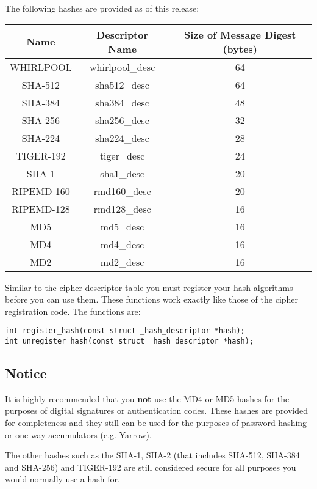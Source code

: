 \documentclass[b5paper]{book}
\begin{document}
The following hashes are provided as of this release:
\begin{center}
\begin{tabular}{|c|c|c|}
      \hline Name & Descriptor Name & Size of Message Digest (bytes) \\
      \hline WHIRLPOOL & whirlpool\_desc & 64 \\
      \hline SHA-512 & sha512\_desc & 64 \\
      \hline SHA-384 & sha384\_desc & 48 \\
      \hline SHA-256 & sha256\_desc & 32 \\
      \hline SHA-224 & sha224\_desc & 28 \\
      \hline TIGER-192 & tiger\_desc & 24 \\
      \hline SHA-1 & sha1\_desc & 20 \\
      \hline RIPEMD-160 & rmd160\_desc & 20 \\
      \hline RIPEMD-128 & rmd128\_desc & 16 \\
      \hline MD5 & md5\_desc & 16 \\
      \hline MD4 & md4\_desc & 16 \\
      \hline MD2 & md2\_desc & 16 \\
      \hline
\end{tabular}
\end{center}

Similar to the cipher descriptor table you must register your hash algorithms before you can use them.  These functions
work exactly like those of the cipher registration code.  The functions are:
\begin{verbatim}
int register_hash(const struct _hash_descriptor *hash);
int unregister_hash(const struct _hash_descriptor *hash);
\end{verbatim}

\subsection{Notice}
It is highly recommended that you \textbf{not} use the MD4 or MD5 hashes for the purposes of digital signatures or authentication codes.  
These hashes are provided for completeness and they still can be used for the purposes of password hashing or one-way accumulators
(e.g. Yarrow).

The other hashes such as the SHA-1, SHA-2 (that includes SHA-512, SHA-384 and SHA-256) and TIGER-192 are still considered secure
for all purposes you would normally use a hash for.
\end{document}
